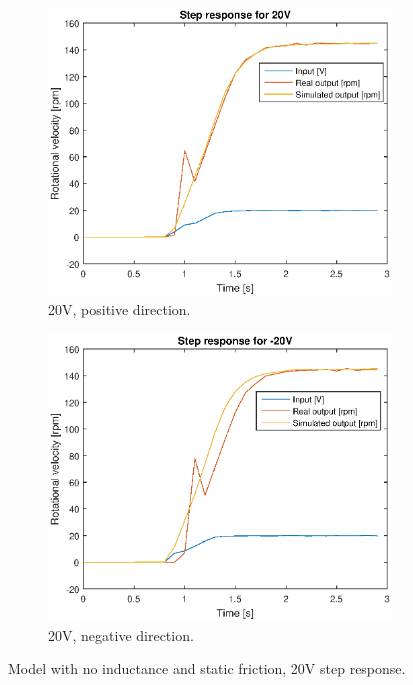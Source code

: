 \begin{figure}[H]
    \centering
    \begin{subfigure}[H]{0.48\textwidth}
    \includegraphics[width=\textwidth]{./img/testrig_20Vstep_no_i_no_fric.eps}
    \caption{20V, positive direction.}
    \label{fig:step20}
    \end{subfigure}
    \begin{subfigure}[H]{0.48\textwidth}
    \includegraphics[width=\textwidth]{./img/testrig_m20Vstep_no_i_no_fric.eps}
    \caption{20V, negative direction.}
    \label{fig:stepm20}
    \end{subfigure}
    \caption{Model with no inductance and static friction, 20V step response.}
\end{figure}
